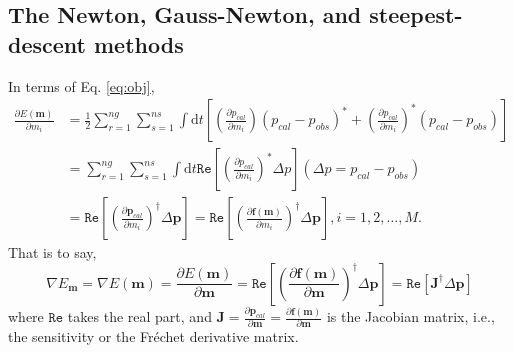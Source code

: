 \subsection{The Newton, Gauss-Newton, and steepest-descent methods}

In terms of Eq. \eqref{eq:obj},
\begin{equation}\label{eq:descent1}
\begin{split}
\frac{\partial E(\textbf{m})}{\partial m_i}
&=\frac{1}{2}\sum_{r=1}^{ng}\sum_{s=1}^{ns}\int \mathrm{d}t\left[\left(\frac{\partial p_{cal}}{\partial m_i}\right)(p_{cal}-p_{obs})^*+
\left(\frac{\partial p_{cal}}{\partial m_i}\right)^*(p_{cal}-p_{obs})\right]\\
&=\sum_{r=1}^{ng}\sum_{s=1}^{ns}\int \mathrm{d}t\mathtt{Re} \left[\left(\frac{\partial p_{cal}}{\partial m_i}\right)^*\Delta p\right] (\Delta p=p_{cal}-p_{obs})\\
&=\mathtt{Re}\left[\left(\frac{\partial \textbf{p}_{cal}}{\partial m_i}\right)^{\dagger}\Delta \textbf{p}\right]
=\mathtt{Re}\left[\left(\frac{\partial \textbf{f}(\textbf{m})}{\partial m_i}\right)^{\dagger}\Delta \textbf{p}\right], 
i=1,2,\ldots,M.
\end{split}
\end{equation}
That is to say,
\begin{equation}\label{eq:grad}
\nabla E_{\textbf{m}}=\nabla E(\textbf{m})=\frac{\partial E(\textbf{m})}{\partial \textbf{m}}
=\mathtt{Re}\left[\left(\frac{\partial \textbf{f}(\textbf{m})}{\partial \textbf{m}}\right)^{\dagger}\Delta \textbf{p}\right]
=\mathtt{Re}\left[\textbf{J}^{\dagger}\Delta \textbf{p}\right]
\end{equation}
where $\mathtt{Re}$ takes the real part, and $\textbf{J}=\frac{\partial \textbf{p}_{cal}}{\partial \textbf{m}}=\frac{\partial \textbf{f}(\textbf{m})}{\partial \textbf{m}}$ is the Jacobian matrix, i.e., the sensitivity or the Fr\'{e}chet derivative matrix.


